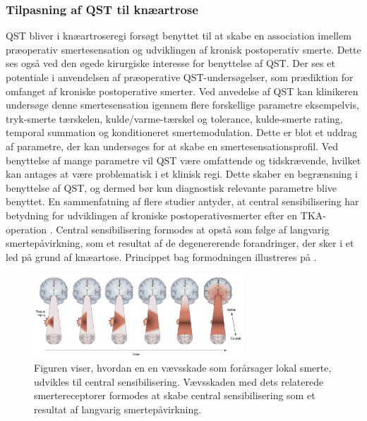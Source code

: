 \subsubsection{Tilpasning af QST til knæartrose}
QST bliver i  knæartroseregi forsøgt benyttet til at skabe en association imellem præoperativ smertesensation og udviklingen af kronisk postoperativ smerte. Dette ses også ved den øgede kirurgiske interesse for benyttelse af QST. Der ses et potentiale i anvendelsen af præoperative QST-undersøgelser, som prædiktion for omfanget af kroniske postoperative smerter. \citep{Wylde2013} Ved anvedelse af QST kan klinikeren undersøge denne smertesensation igennem flere forskellige parametre eksempelvis, tryk-smerte tærskelen, kulde/varme-tærskel og tolerance, kulde-smerte rating, temporal summation og konditioneret smertemodulation. \citep{Cornelius2015} Dette er blot et uddrag af parametre, der kan undersøges for at skabe en smertesensationsprofil. Ved benyttelse af mange parametre vil QST være omfattende og tidskrævende, hvilket kan antages at være problematisk i et klinisk regi. Dette skaber en begrænsning i benyttelse af QST, og dermed bør kun diagnostisk relevante parametre blive benyttet. \citep{Nielsen2009} En sammenfatning af flere studier antyder, at central sensibilisering har betydning for udviklingen af kroniske postoperativesmerter efter en TKA-operation \citep{Suokas2012}. Central sensibilisering formodes at opstå som følge af langvarig smertepåvirkning, som et resultat af de degenererende forandringer, der sker i et led på grund af knæartose. \citep{Arendt-Nielsen2015b} Princippet bag formodningen illustreres på  \citep{Graven-Nielsen2010} . 

\begin{figure}[H] 
	\begin{center}
		\includegraphics[width=0.7\textwidth]{figures/dHTAanalyse/widespread_sens}
	\end{center}
	\caption{Figuren viser, hvordan en en vævsskade som forårsager lokal smerte, udvikles til central sensibilisering. Vævsskaden med dets relaterede smertereceptorer formodes at skabe central sensibilisering som et resultat af langvarig smertepåvirkning. \citep{Graven-Nielsen2010}} 
	\label{fig:widespread_sens} 
\end{figure} \vspace{-.25cm}

